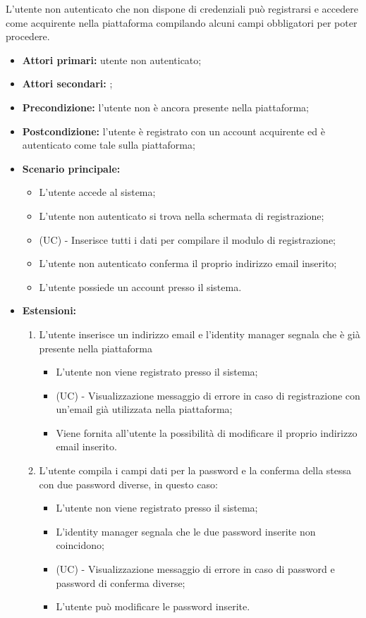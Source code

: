 L'utente non autenticato che non dispone di credenziali può registrarsi e accedere come acquirente nella piattaforma compilando alcuni campi obbligatori per poter procedere.
\begin{itemize}
	\item \textbf{Attori primari:} utente non autenticato;
	\item \textbf{Attori secondari:} ;
	\item \textbf{Precondizione:} l'utente non è ancora presente nella piattaforma;
	\item \textbf{Postcondizione:} l'utente è registrato con un account acquirente ed è autenticato come tale sulla piattaforma;
	\item \textbf{Scenario principale:}
	\begin{itemize}
		\item L'utente accede al sistema;
		\item L'utente non autenticato si trova nella schermata di registrazione;
		\item (UC) - Inserisce tutti i dati per compilare il modulo di registrazione;
		\item L'utente non autenticato conferma il proprio indirizzo email inserito;
		\item L'utente possiede un account presso il sistema.
	\end{itemize}
	\item \textbf{Estensioni:}
	\begin{enumerate}[label=\lett]
		\item L'utente inserisce un indirizzo email e l'identity manager segnala che è già presente nella piattaforma
		\begin{itemize}
			\item L'utente non viene registrato presso il sistema;
			\item (UC) - Visualizzazione messaggio di errore in caso di registrazione con un'email già utilizzata nella piattaforma;
			\item Viene fornita all'utente la possibilità di modificare il proprio indirizzo email inserito.
		\end{itemize}
		\item L'utente compila i campi dati per la password e la conferma della stessa con due password diverse, in questo caso:
		\begin{itemize}
			\item L'utente non viene registrato presso il sistema;
			\item L'identity manager segnala che le due password inserite non coincidono;
			\item (UC) - Visualizzazione messaggio di errore in caso di password e password di conferma diverse;
			\item L'utente può modificare le password inserite.
		\end{itemize}
	\end{enumerate}
\end{itemize}

